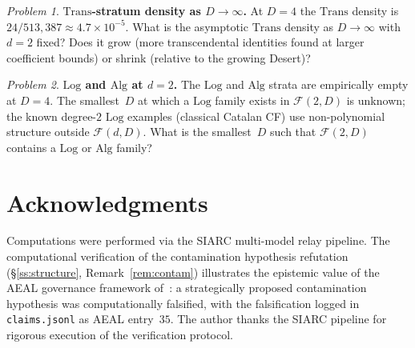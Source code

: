 \documentclass{amsart}
\theoremstyle{definition}
\theoremstyle{remark}
\newtheorem{problem}{Problem}
\newcommand{\FF}{\mathcal{F}}
\newcommand{\Log}{\mathrm{Log}}
\newcommand{\Alg}{\mathrm{Alg}}
\newcommand{\Trans}{\mathrm{Trans}}
\begin{document}
\begin{problem}\label{prob:density}
\textbf{$\Trans$-stratum density as $D \to \infty$.}
At $D = 4$ the $\Trans$ density is $24/513{,}387 \approx 4.7 \times
10^{-5}$.  What is the asymptotic $\Trans$ density as $D \to \infty$ with
$d = 2$ fixed?  Does it grow (more transcendental identities found at
larger coefficient bounds) or shrink (relative to the growing Desert)?
\end{problem}

\begin{problem}\label{prob:logalg}
\textbf{$\Log$ and $\Alg$ at $d = 2$.}
The $\Log$ and $\Alg$ strata are empirically empty at $D = 4$.  The
smallest~$D$ at which a $\Log$ family exists in $\FF(2,D)$ is unknown;
the known degree-$2$ $\Log$ examples (classical Catalan CF) use
non-polynomial structure outside $\FF(d,D)$.  What is the smallest~$D$
such that $\FF(2,D)$ contains a $\Log$ or $\Alg$ family?
\end{problem}

\section*{Acknowledgments}

Computations were performed via the SIARC multi-model relay pipeline.
The computational verification of the contamination hypothesis refutation
(\S\ref{ss:structure}, Remark~\ref{rem:contam}) illustrates the epistemic
value of the AEAL governance framework of~\cite{aeal}: a strategically
proposed contamination hypothesis was computationally falsified, with the
falsification logged in \texttt{claims.jsonl} as AEAL entry~$35$.  The
author thanks the SIARC pipeline for rigorous execution of the
verification protocol.



\end{document}
